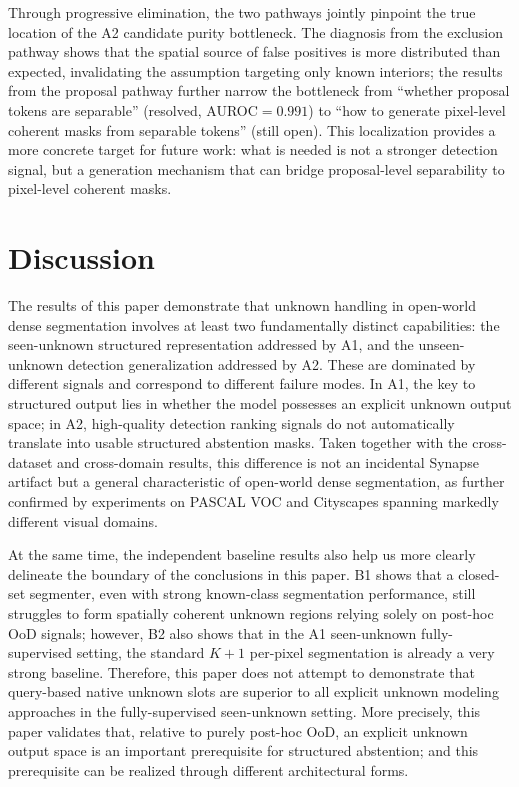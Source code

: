 \documentclass[3p,twocolumn,authoryear]{elsarticle}
\begin{document}
Through progressive elimination, the two pathways jointly pinpoint the true location
of the A2 candidate purity bottleneck.
The diagnosis from the exclusion pathway shows that the spatial source of false positives
is more distributed than expected, invalidating the assumption targeting only known
interiors; the results from the proposal pathway further narrow the bottleneck from
``whether proposal tokens are separable'' (resolved, AUROC$=0.991$) to ``how to generate
pixel-level coherent masks from separable tokens'' (still open).
This localization provides a more concrete target for future work: what is needed is
not a stronger detection signal, but a generation mechanism that can bridge
proposal-level separability to pixel-level coherent masks.


\section{Discussion}\label{sec:discussion}
The results of this paper demonstrate that unknown handling in open-world dense
segmentation involves at least two fundamentally distinct capabilities: the
seen-unknown structured representation addressed by A1, and the unseen-unknown detection
generalization addressed by A2. These are dominated by different signals and correspond
to different failure modes. In A1, the key to structured output lies in whether the model
possesses an explicit unknown output space; in A2, high-quality detection ranking signals
do not automatically translate into usable structured abstention masks. Taken together
with the cross-dataset and cross-domain results, this difference is not an incidental
Synapse artifact but a general characteristic of open-world dense segmentation, as further
confirmed by experiments on PASCAL VOC and Cityscapes spanning markedly different visual domains.

At the same time, the independent baseline results also help us more clearly delineate
the boundary of the conclusions in this paper. B1 shows that a closed-set segmenter,
even with strong known-class segmentation performance, still struggles to form spatially
coherent unknown regions relying solely on post-hoc OoD signals; however, B2 also shows
that in the A1 seen-unknown fully-supervised setting, the standard $K+1$ per-pixel
segmentation is already a very strong baseline. Therefore, this paper does not attempt
to demonstrate that query-based native unknown slots are superior to all explicit unknown
modeling approaches in the fully-supervised seen-unknown setting. More precisely, this
paper validates that, relative to purely post-hoc OoD, an explicit unknown output space
is an important prerequisite for structured abstention; and this prerequisite can be
realized through different architectural forms.
\end{document}
